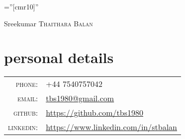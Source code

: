 \documentclass[a4paper,10pt]{article}
\begin{document}

\pagestyle{empty} %

\font\fb=''[cmr10]'' %

\par{\centering
  {\huge Sreekumar \textsc{Thaithara Balan}
  }\bigskip\par}

\section{personal details}

\begin{tabular}{r|p{11cm}}
    \textsc{phone:}     & +44 7540757042\\
    \textsc{email:}     & \href{mailto:tbs1980@gmail.com}{tbs1980@gmail.com} \\
    \textsc{github:} & \href{https://github.com/tbs1980}{https://github.com/tbs1980} \\
    \textsc{linkedin:} & \href{https://www.linkedin.com/in/stbalan}{https://www.linkedin.com/in/stbalan}
\end{tabular}

\end{document}

